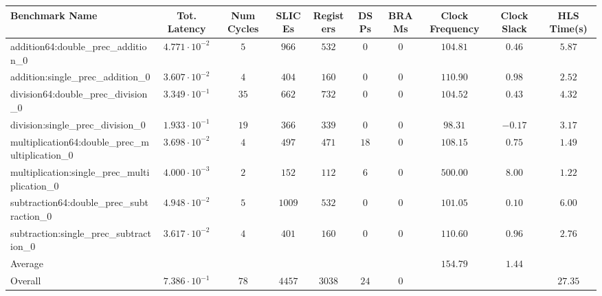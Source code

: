 \begin{tabular}{|l|c|c|c|c|c|c|c|c|c|}
\hline
Benchmark Name                                   & Tot. Latency            & Num Cycles & SLICEs   & Registers & DSPs   & BRAMs & Clock Frequency & Clock Slack & HLS Time(s) \\
\hline
addition64:double\_prec\_addition\_0             & $ 4.771 \cdot 10^{-2} $ & $ 5      $ & $ 966  $ & $ 532   $ & $ 0  $ & $ 0 $ & $ 104.81      $ & $ 0.46    $ & $ 5.87    $ \\
addition:single\_prec\_addition\_0               & $ 3.607 \cdot 10^{-2} $ & $ 4      $ & $ 404  $ & $ 160   $ & $ 0  $ & $ 0 $ & $ 110.90      $ & $ 0.98    $ & $ 2.52    $ \\
division64:double\_prec\_division\_0             & $ 3.349 \cdot 10^{-1} $ & $ 35     $ & $ 662  $ & $ 732   $ & $ 0  $ & $ 0 $ & $ 104.52      $ & $ 0.43    $ & $ 4.32    $ \\
division:single\_prec\_division\_0               & $ 1.933 \cdot 10^{-1} $ & $ 19     $ & $ 366  $ & $ 339   $ & $ 0  $ & $ 0 $ & $ 98.31       $ & $ -0.17   $ & $ 3.17    $ \\
multiplication64:double\_prec\_multiplication\_0 & $ 3.698 \cdot 10^{-2} $ & $ 4      $ & $ 497  $ & $ 471   $ & $ 18 $ & $ 0 $ & $ 108.15      $ & $ 0.75    $ & $ 1.49    $ \\
multiplication:single\_prec\_multiplication\_0   & $ 4.000 \cdot 10^{-3} $ & $ 2      $ & $ 152  $ & $ 112   $ & $ 6  $ & $ 0 $ & $ 500.00      $ & $ 8.00    $ & $ 1.22    $ \\
subtraction64:double\_prec\_subtraction\_0       & $ 4.948 \cdot 10^{-2} $ & $ 5      $ & $ 1009 $ & $ 532   $ & $ 0  $ & $ 0 $ & $ 101.05      $ & $ 0.10    $ & $ 6.00    $ \\
subtraction:single\_prec\_subtraction\_0         & $ 3.617 \cdot 10^{-2} $ & $ 4      $ & $ 401  $ & $ 160   $ & $ 0  $ & $ 0 $ & $ 110.60      $ & $ 0.96    $ & $ 2.76    $ \\
\hline
Average                                          & $                     $ & $        $ & $      $ & $       $ & $    $ & $   $ & $ 154.79      $ & $ 1.44    $ & $         $ \\
\hline
Overall                                          & $ 7.386 \cdot 10^{-1} $ & $ 78     $ & $ 4457 $ & $ 3038  $ & $ 24 $ & $ 0 $ & $             $ & $         $ & $ 27.35   $ \\
\hline
\end{tabular}
